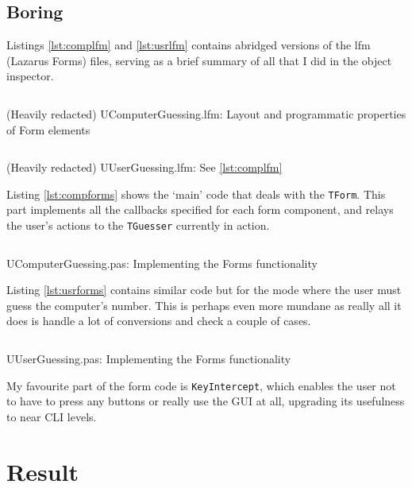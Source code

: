 \documentclass[a4paper,11pt]{article}
\newenvironment{longlisting}
{\addvspace{\baselineskip}\captionsetup{type=listing}}
{\addvspace{\baselineskip}}
\begin{document}
    \subsection{Boring}

    Listings \ref{lst:complfm} and \ref{lst:usrlfm} contains abridged versions
    of the lfm (Lazarus Forms) files, serving as a brief summary of all that I
    did in the object inspector.

\begin{longlisting}
\inputminted{pascal}{UComputerGuessing.lfm}
\caption{(Heavily redacted) UComputerGuessing.lfm: Layout and programmatic
properties of Form elements}
\label{lst:complfm}
\end{longlisting}

\begin{longlisting}
\inputminted{pascal}{UUserGuessing.lfm}
\caption{(Heavily redacted) UUserGuessing.lfm: See \ref{lst:complfm}}
\label{lst:usrlfm}
\end{longlisting}

    Listing \ref{lst:compforms} shows the `main' code that deals with the
    \texttt{TForm}. This part implements all the callbacks specified for each
    form component, and relays the user's actions to the \texttt{TGuesser}
    currently in action.

\begin{longlisting}
\inputminted{Pascal}{../UComputerGuessing.pas}
\caption{UComputerGuessing.pas: Implementing the Forms functionality}
\label{lst:compforms}
\end{longlisting}

    Listing \ref{lst:usrforms} contains similar code but for the mode where the
    user must guess the computer's number. This is perhaps even more mundane as
    really all it does is handle a lot of conversions and check a couple of
    cases.

\begin{longlisting}
\inputminted{Pascal}{../UUserGuessing.pas}
\caption{UUserGuessing.pas: Implementing the Forms functionality}
\label{lst:usrforms}
\end{longlisting}

    My favourite part of the form code is \texttt{KeyIntercept}, which enables
    the user not to have to press any buttons or really use the GUI at all,
    upgrading its usefulness to near CLI levels.

    \section{Result}
\end{document}
